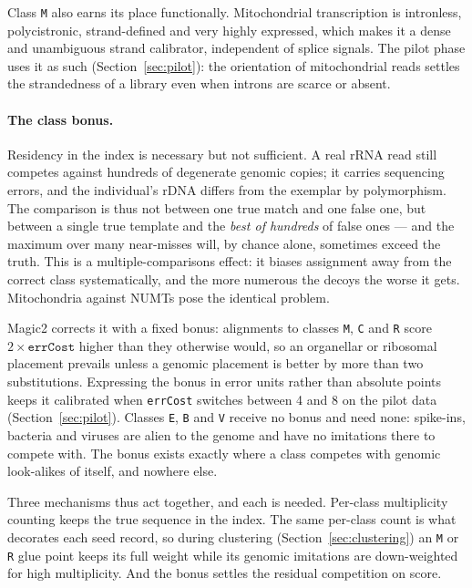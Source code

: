 \documentclass[11pt]{article}
\begin{document}
Class \texttt{M} also earns its place functionally.
Mitochondrial transcription is intronless, polycistronic, strand-defined
and very highly expressed, which makes it a dense and unambiguous strand
calibrator, independent of splice signals.
The pilot phase uses it as such (Section~\ref{sec:pilot}): the
orientation of mitochondrial reads settles the strandedness of a library
even when introns are scarce or absent.

\paragraph{The class bonus.}
Residency in the index is necessary but not sufficient.
A real rRNA read still competes against hundreds of degenerate genomic
copies; it carries sequencing errors, and the individual's rDNA differs
from the exemplar by polymorphism.
The comparison is thus not between one true match and one false one, but
between a single true template and the \emph{best of hundreds} of false
ones --- and the maximum over many near-misses will, by chance alone,
sometimes exceed the truth.
This is a multiple-comparisons effect: it biases assignment away from
the correct class systematically, and the more numerous the decoys the
worse it gets.
Mitochondria against NUMTs pose the identical problem.

Magic2 corrects it with a fixed bonus: alignments to classes
\texttt{M}, \texttt{C} and \texttt{R} score $2\times\texttt{errCost}$
higher than they otherwise would, so an organellar or ribosomal
placement prevails unless a genomic placement is better by more than two
substitutions.
Expressing the bonus in error units rather than absolute points keeps it
calibrated when \texttt{errCost} switches between 4 and 8 on the pilot
data (Section~\ref{sec:pilot}).
Classes \texttt{E}, \texttt{B} and \texttt{V} receive no bonus and need
none: spike-ins, bacteria and viruses are alien to the genome and have
no imitations there to compete with.
The bonus exists exactly where a class competes with genomic look-alikes
of itself, and nowhere else.

Three mechanisms thus act together, and each is needed.
Per-class multiplicity counting keeps the true sequence in the index.
The same per-class count is what decorates each seed record, so during
clustering (Section~\ref{sec:clustering}) an \texttt{M} or \texttt{R}
glue point keeps its full weight while its genomic imitations are
down-weighted for high multiplicity.
And the bonus settles the residual competition on score.
\end{document}
